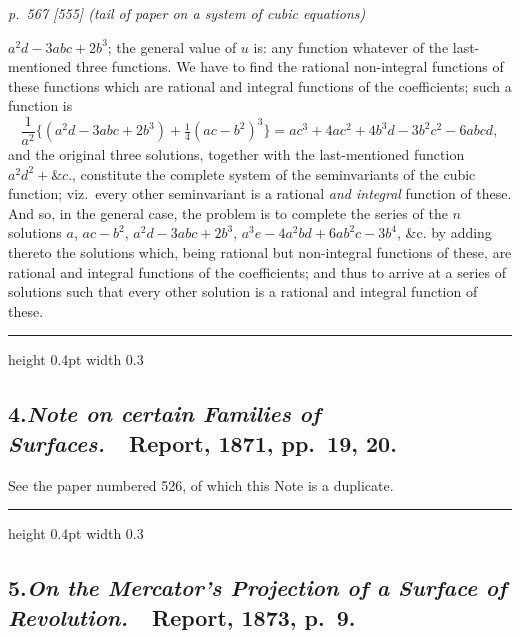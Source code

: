 \documentclass[11pt,a4paper]{article}
\theoremstyle{plain}
\theoremstyle{definition}
\begin{document}

\noindent
\textit{p.~567 [555] (tail of paper on a system of cubic equations)}
\smallskip

\noindent
$a^2 d - 3 abc + 2 b^3$; the general value of $u$ is: any function whatever of the
last-mentioned three functions.  We have to find the rational non-integral functions
of these functions which are rational and integral functions of the coefficients; such a
function is
\[
\frac{1}{a^2}\{(a^2 d - 3abc + 2b^3) + \tfrac{1}{4}(ac - b^2)^3\}
   = a c^3 + 4 a c^2 + 4 b^3 d - 3 b^2 c^2 - 6 a b c d,
\]
and the original three solutions, together with the last-mentioned function $a^2 d^2 + \&c.$,
constitute the complete system of the seminvariants of the cubic function; viz.\ every
other seminvariant is a rational \emph{and integral} function of these.  And so, in the general
case, the problem is to complete the series of the $n$ solutions $a$, $ac-b^2$, $a^2 d - 3abc + 2b^3$,
$a^3 e - 4a^2 bd + 6ab^2 c - 3b^4$, \&c. by adding thereto the solutions which, being rational but
non-integral functions of these, are rational and integral functions of the coefficients;
and thus to arrive at a series of solutions such that every other solution is a rational
and integral function of these.

\vspace{1em}
\hrule height 0.4pt width 0.3\linewidth
\vspace{1em}

\subsection*{4.\quad \textit{Note on certain Families of Surfaces.}\ \ Report, 1871, pp.~19, 20.}

See the paper numbered 526, of which this Note is a duplicate.

\vspace{1em}
\hrule height 0.4pt width 0.3\linewidth
\vspace{1em}

\subsection*{5.\quad \textit{On the Mercator's Projection of a Surface of Revolution.}\ \ Report, 1873, p.~9.}
\end{document}
